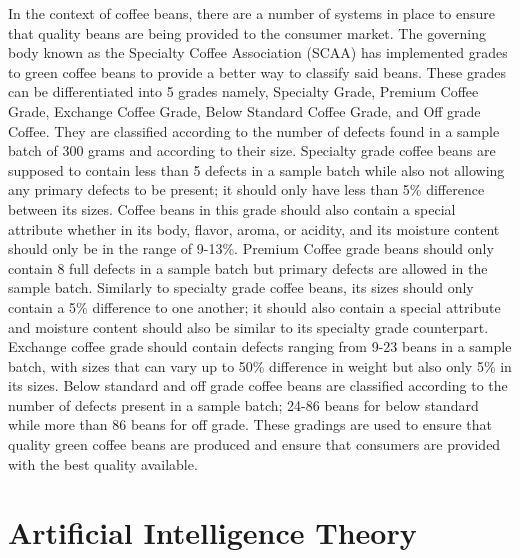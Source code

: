 In the context of coffee beans, there are a number of systems in place to ensure that quality beans are being provided to the consumer market. The governing body known as the Specialty Coffee Association (SCAA) has implemented grades to green coffee beans to provide a better way to classify said beans. These grades can be differentiated into 5 grades namely, Specialty Grade, Premium Coffee Grade, Exchange Coffee Grade, Below Standard Coffee Grade, and Off grade Coffee. They are classified according to the number of defects found in a sample batch of 300 grams and according to their size. Specialty grade coffee beans are supposed to contain less than 5 defects in a sample batch while also not allowing any primary defects to be present; it should only have less than 5\% difference between its sizes. Coffee beans in this grade should also contain a special attribute whether in its body, flavor, aroma, or acidity, and its moisture content should only be in the range of 9-13\%. Premium Coffee grade beans should only contain 8 full defects in a sample batch but primary defects are allowed in the sample batch. Similarly to specialty grade coffee beans, its sizes should only contain a 5\% difference to one another; it should also contain a special attribute and moisture content should also be similar to its specialty grade counterpart. Exchange coffee grade should contain defects ranging from 9-23 beans in a sample batch, with sizes that can vary up to 50\% difference in weight but also only 5\% in its sizes. Below standard and off grade coffee beans are classified according to the number of defects present in a sample batch; 24-86 beans for below standard while more than 86 beans for off grade. These gradings are used to ensure that quality green coffee beans are produced and ensure that consumers are provided with the best quality available. 

\section{Artificial Intelligence Theory}

